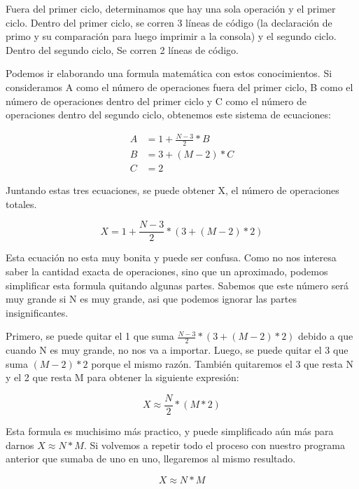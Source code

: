 \documentclass{article}
\begin{document}
Fuera del primer ciclo, determinamos que hay una sola operación y el primer ciclo.
Dentro del primer ciclo, se corren 3 líneas de código (la declaración de primo y su comparación para luego imprimir a la consola) y el segundo ciclo.
Dentro del segundo ciclo, Se corren 2 líneas de código.

Podemos ir elaborando una formula matemática con estos conocimientos. Si consideramos A como el número de operaciones fuera del primer ciclo, B como el número de operaciones dentro del primer ciclo y C como el número de operaciones dentro del segundo ciclo, obtenemos este sistema de ecuaciones:

\begin{align}
    A &= 1 + \frac{N - 3}{2} * B \\
    B &= 3 + (M - 2) * C \\
    C &= 2
\end{align}

Juntando estas tres ecuaciones, se puede obtener X, el número de operaciones totales.

\begin{equation}
    X = 1 + \frac{N - 3}{2} * (3 + (M - 2) * 2)
\end{equation}

Esta ecuación no esta muy bonita y puede ser confusa. Como no nos interesa saber la cantidad exacta de operaciones, sino que un aproximado, podemos simplificar esta formula quitando algunas partes. Sabemos que este número será muy grande si N es muy grande, asi que podemos ignorar las partes insignificantes.

Primero, se puede quitar el 1 que suma $\frac{N - 3}{2} * (3 + (M - 2) * 2)$ debido a que cuando N es muy grande, no nos va a importar. Luego, se puede quitar el 3 que suma $(M - 2) * 2$ porque el mismo razón. También quitaremos el 3 que resta N y el 2 que resta M para obtener la siguiente expresión:

\begin{equation}
    X \approx \frac{N}{2} * (M * 2)
\end{equation}

Esta formula es muchisimo más practico, y puede simplificado aún más para darnos $X \approx N * M$. Si volvemos a repetir todo el proceso con nuestro programa anterior que sumaba de uno en uno, llegaremos al mismo resultado.

\begin{equation}
    X \approx N * M
\end{equation}
\end{document}
